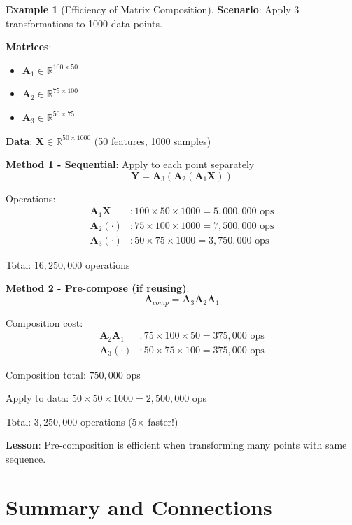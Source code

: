 \documentclass[12pt,a4paper]{article}
\theoremstyle{definition}
\newtheorem{example}{Example}[section]
\begin{document}
\begin{example}[Efficiency of Matrix Composition]
\textbf{Scenario}: Apply 3 transformations to 1000 data points.

\textbf{Matrices}:
\begin{itemize}
\item $\mathbf{A}_1 \in \mathbb{R}^{100 \times 50}$
\item $\mathbf{A}_2 \in \mathbb{R}^{75 \times 100}$
\item $\mathbf{A}_3 \in \mathbb{R}^{50 \times 75}$
\end{itemize}

\textbf{Data}: $\mathbf{X} \in \mathbb{R}^{50 \times 1000}$ (50 features, 1000 samples)

\textbf{Method 1 - Sequential}: Apply to each point separately
\[
\mathbf{Y} = \mathbf{A}_3(\mathbf{A}_2(\mathbf{A}_1\mathbf{X}))
\]

Operations:
\begin{align*}
\mathbf{A}_1\mathbf{X} &: 100 \times 50 \times 1000 = 5,000,000 \text{ ops} \\
\mathbf{A}_2(\cdot) &: 75 \times 100 \times 1000 = 7,500,000 \text{ ops} \\
\mathbf{A}_3(\cdot) &: 50 \times 75 \times 1000 = 3,750,000 \text{ ops}
\end{align*}

Total: $16,250,000$ operations

\textbf{Method 2 - Pre-compose (if reusing)}:
\[
\mathbf{A}_{comp} = \mathbf{A}_3\mathbf{A}_2\mathbf{A}_1
\]

Composition cost:
\begin{align*}
\mathbf{A}_2\mathbf{A}_1 &: 75 \times 100 \times 50 = 375,000 \text{ ops} \\
\mathbf{A}_3(\cdot) &: 50 \times 75 \times 100 = 375,000 \text{ ops}
\end{align*}

Composition total: $750,000$ ops

Apply to data: $50 \times 50 \times 1000 = 2,500,000$ ops

Total: $3,250,000$ operations (5× faster!)

\textbf{Lesson}: Pre-composition is efficient when transforming many points with same sequence.
\end{example}

\section{Summary and Connections}
\end{document}
